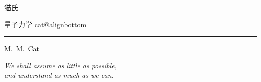 \begin{titlepage}
  \raggedright
  \setlength{\parskip}{0pt}
  \vspace*{40mm}
  {\color{accent}\fontsize{18}{22}\selectfont 猫氏\par}
  \vspace{0mm}
  {\fontsize{50}{60}\selectfont 量子力学\hspace{4mm}%
    \csname cat@alignbottom\par}
  \vspace{7mm}
  {\color{accent}\rule{\linewidth}{0.45pt}\par}
  \vspace{3mm}
  {\normalsize M.\ M.\ Cat\par}
  \vfill
  {\large\itshape
    We shall assume as little as possible,\\
    and understand as much as we can.\par}
  \vspace*{15mm}
\end{titlepage}

